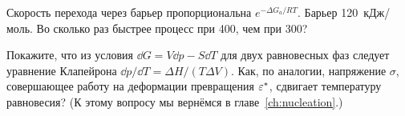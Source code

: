 \begin{exercise}
Скорость перехода через барьер пропорциональна $e^{-\Delta G_a/RT}$. Барьер 120~кДж/моль. Во сколько раз быстрее
процесс при 400\degC, чем при 300\degC?
\end{exercise}

\begin{exercise}
Покажите, что из условия $\dd G = V\dd p - S\dd T$ для двух равновесных фаз следует уравнение Клапейрона
$\dd p/\dd T = \Delta H/(T\Delta V)$. Как, по аналогии, напряжение $\sigma$, совершающее работу на деформации
превращения $\varepsilon^*$, сдвигает температуру равновесия? (К этому вопросу мы вернёмся в главе~\ref{ch:nucleation}.)
\end{exercise}
